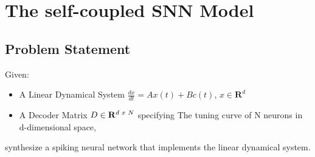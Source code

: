 \section{The self-coupled SNN Model}


\subsection{Problem Statement} Given:

\begin{itemize}
    \item A Linear Dynamical System  $\frac{dx}{dt} = A x(t) + B c(t)$,  $x \in \mathbf{R}^d$
    
    \item A Decoder Matrix $D \in \mathbf{R}^{d\hspace{1mm} x \hspace{1mm}N}$ specifying The tuning curve of N neurons in d-dimensional space,
    
\end{itemize}
synthesize a spiking neural network that implements the linear dynamical system.   




